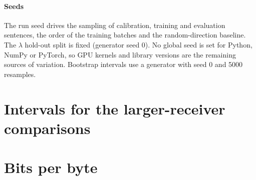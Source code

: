 \documentclass[preprint,12pt]{elsarticle}
\begin{document}
\paragraph{Seeds} The run seed drives the sampling of calibration, training and evaluation sentences, the order of the training batches and the random-direction baseline. The $\lambda$ hold-out split is fixed (generator seed 0). No global seed is set for Python, NumPy or PyTorch, so GPU kernels and library versions are the remaining sources of variation. Bootstrap intervals use a generator with seed 0 and 5000 resamples.

\section{Intervals for the larger-receiver comparisons}
\label{app:ci}
\begin{table}[H]
\centering\scriptsize
\caption{Table~\ref{tab:scale} with 95\,\% paired bootstrap intervals (5000 resamples), first three baselines.}
\label{tab:scaleci1}
\resizebox{\textwidth}{!}{}
\end{table}
\begin{table}[H]
\centering\scriptsize
\caption{Table~\ref{tab:scale} with 95\,\% paired bootstrap intervals, remaining baselines and the unchanged receiver.}
\label{tab:scaleci2}
\resizebox{\textwidth}{!}{}
\end{table}

\section{Bits per byte}
\label{app:bpb}
\begin{table}[H]
\centering\scriptsize
\caption{Same comparisons as Table~\ref{tab:scale} in bits per byte: the mean paired NLL difference divided by $\ln 2$ and by the mean UTF-8 bytes per evaluation sentence (negative = ridge better). One nat per sentence is about 0.009 bits per byte.}
\label{tab:bpb}
\resizebox{\textwidth}{!}{}
\end{table}

\clearpage


\end{document}
